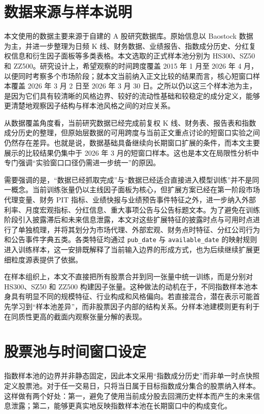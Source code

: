 \section{数据来源与样本说明}

本文使用的数据主要来源于自建的 A 股研究数据库。原始信息以 Baostock 数据为主，并进一步整理为日频 K 线、财务数据、业绩报告、指数成分历史、分红复权信息和衍生因子面板等多类表格。本文选取的正式样本池分别为 HS300、SZ50 和 ZZ500。研究设计上，希望观察的时间跨度覆盖 2015 年 1 月至 2026 年 4 月，以便同时考察多个市场阶段；就本文当前纳入正文比较的结果而言，核心短窗口样本覆盖 2026 年 3 月 2 日至 2026 年 3 月 30 日。之所以仍以这三个样本池为主，是因为它们具有较清晰的风格边界、较好的流动性基础和较稳定的成分定义，能够更清楚地观察因子结构与样本池风格之间的对应关系。

从数据覆盖角度看，当前研究数据已经完成前复权 K 线、财务表、报告表和指数成分历史的整理，但原始层数据的可用跨度与当前正文重点讨论的短窗口实验之间仍然存在差异。也就是说，数据基础具备继续向长期窗口扩展的条件，而本文主要展示的比较结果仍集中于 2026 年 3 月的短窗口样本。这也是本文在局限性分析中专门强调“实验窗口口径仍需进一步统一”的原因。

需要强调的是，“数据已经抓取完成”与“数据已经适合直接进入模型训练”并不是同一概念。当前训练张量仍以主线因子面板为核心，但扩展方案已经在第一阶段市场代理变量、财务 PIT 指标、业绩快报与业绩预告事件特征之外，进一步纳入外部利率、月度宏观指标、分红信息、重大事项公告与公告标题文本。为了避免在训练阶段引入披露滞后和未来信息泄露，本文对这些扩展特征的披露时点与可用时点进行了单独梳理，并将其划分为市场代理、外部宏观、财务点时特征、分红公司行为和公告事件字典五类。各类特征均通过 \texttt{pub\_date} 与 \texttt{available\_date} 的映射规则进入训练样本，这一安排既解释了当前输入边界的形成方式，也为后续继续扩展更细粒度源表提供了依据。

在样本组织上，本文不直接把所有股票合并到同一张量中统一训练，而是分别对 HS300、SZ50 和 ZZ500 构建因子张量。这种做法的动机在于，不同指数样本池本身具有明显不同的规模特征、行业构成和风格偏向。若直接混合，潜在表示可能首先学习到“样本池差异”，而非股票因子内部的结构关系。分样本池建模则更有利于在同质性更高的截面内观察张量分解的表现。

\section{股票池与时间窗口设定}

指数样本池的边界并非静态固定，因此本文采用“指数成分历史”而非单一时点快照定义股票池。对于任一交易日，只将当日属于目标指数成分集合的股票纳入样本。这样做有两个好处：第一，避免了使用当前成分股去回溯历史样本而产生的未来信息泄露；第二，能够更真实地反映指数样本池在长期窗口中的构成变化。

